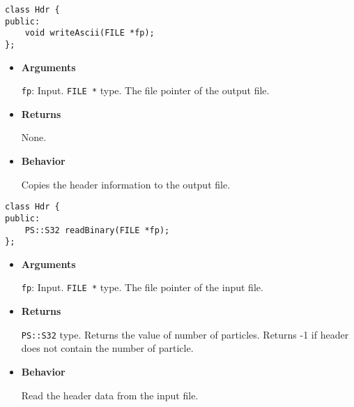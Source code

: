 \label{sec:Hdr_writeAscii}

\begin{screen}
\begin{verbatim}
class Hdr {
public:
    void writeAscii(FILE *fp);
};
\end{verbatim}
\end{screen}

\begin{itemize}

\item {\bf Arguments}

  \texttt{fp}: Input. \texttt{FILE *} type. The file pointer of the output file.

\item {\bf Returns}

  None.
  
\item {\bf Behavior}

  Copies the header information to the output file.
    
\end{itemize}

\label{sec:Hdr_readBinary}

\begin{screen}
\begin{verbatim}
class Hdr {
public:
    PS::S32 readBinary(FILE *fp);
};
\end{verbatim}
\end{screen}

\begin{itemize}

\item {\bf Arguments}

  \texttt{fp}: Input. \texttt{FILE *} type. The file pointer of the input file.

\item {\bf Returns}

  \texttt{PS::S32} type. Returns the value of number of particles. Returns -1 if header does not contain the number of particle.
  
\item {\bf Behavior}

  Read the header data from the input file.

\end{itemize}
  
\label{sec:Hdr_writeBinary}

